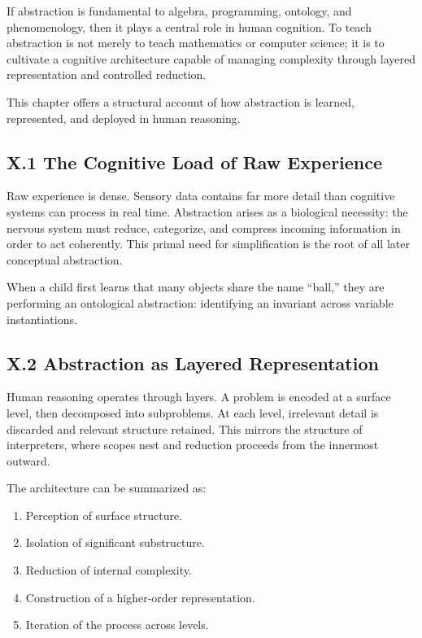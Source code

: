 \documentclass[11pt,letterpaper]{article}
\begin{document}
If abstraction is fundamental to algebra, programming, ontology, and phenomenology, then it plays a central role in human cognition. To teach abstraction is not merely to teach mathematics or computer science; it is to cultivate a cognitive architecture capable of managing complexity through layered representation and controlled reduction.

This chapter offers a structural account of how abstraction is learned, represented, and deployed in human reasoning.

\subsection{X.1 The Cognitive Load of Raw Experience}

Raw experience is dense. Sensory data contains far more detail than cognitive systems can process in real time. Abstraction arises as a biological necessity: the nervous system must reduce, categorize, and compress incoming information in order to act coherently. This primal need for simplification is the root of all later conceptual abstraction.

When a child first learns that many objects share the name ``ball,'' they are performing an ontological abstraction: identifying an invariant across variable instantiations.

\subsection{X.2 Abstraction as Layered Representation}

Human reasoning operates through layers. A problem is encoded at a surface level, then decomposed into subproblems. At each level, irrelevant detail is discarded and relevant structure retained. This mirrors the structure of interpreters, where scopes nest and reduction proceeds from the innermost outward.

The architecture can be summarized as:

\begin{enumerate}
    \item Perception of surface structure.
    \item Isolation of significant substructure.
    \item Reduction of internal complexity.
    \item Construction of a higher-order representation.
    \item Iteration of the process across levels.
\end{enumerate}
\end{document}
